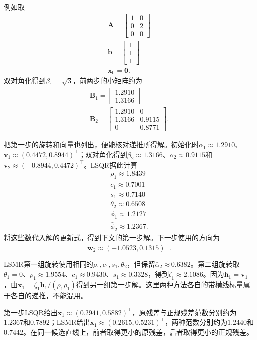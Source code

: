 例如取
\[
\begin{gathered}
\bm A=\begin{bmatrix}1&0\\0&2\\0&0\end{bmatrix}\\
\bm b=\begin{bmatrix}1\\1\\1\end{bmatrix}\\
\bm x_0=\bm0.
\end{gathered}
\]
双对角化得到$\beta_1=\sqrt3$，前两步的小矩阵约为
\[
\begin{gathered}
\bm B_1=\begin{bmatrix}1.2910\\1.3166\end{bmatrix}\\
\bm B_2=\begin{bmatrix}1.2910&0\\1.3166&0.9115\\0&0.8771\end{bmatrix}.
\end{gathered}
\]

把第一步的旋转和向量也列出，便能核对递推所得解。初始化时$\alpha_1\approx1.2910$、$\bm v_1\approx(0.4472,0.8944)^\top$；双对角化得到$\beta_2\approx1.3166$、$\alpha_2\approx0.9115$和$\bm v_2\approx(-0.8944,0.4472)^\top$。LSQR据此计算
\[
 \begin{gathered}
\rho_1\approx1.8439\\
c_1\approx0.7001\\
s_1\approx0.7140\\
\theta_2\approx0.6508\\
\phi_1\approx1.2127\\
\bar\phi_2\approx1.2367.
 \end{gathered}
\]
将这些数代入解的更新式，得到下文的第一步解。下一步使用的方向为
\[
 \bm w_2\approx(-1.0523,0.1315)^\top.
\]

LSMR第一组旋转使用相同的$\rho_1,c_1,s_1,\theta_2$，但保留$\bar\alpha_2\approx0.6382$。第二组旋转取$\bar\theta_1=0$、$\bar\rho_1\approx1.9554$、$\bar c_1\approx0.9430$、$\bar s_1\approx0.3328$，得到$\zeta_1\approx2.1086$。因为$\bar{\bm h}_1=\bm v_1$，由$\bm x_1=\zeta_1\bar{\bm h}_1/(\rho_1\bar\rho_1)$得到另一组第一步解。这里两种方法各自的带横线标量属于各自的递推，不能混用。

第一步LSQR给出$\bm x_1\approx(0.2941,0.5882)^\top$，原残差与正规残差范数分别约为$1.2367$和$0.7892$；LSMR给出$\bm x_1\approx(0.2615,0.5231)^\top$，两种范数分别约为$1.2440$和$0.7442$。在同一候选直线上，前者取得更小的原残差，后者取得更小的正规残差。

